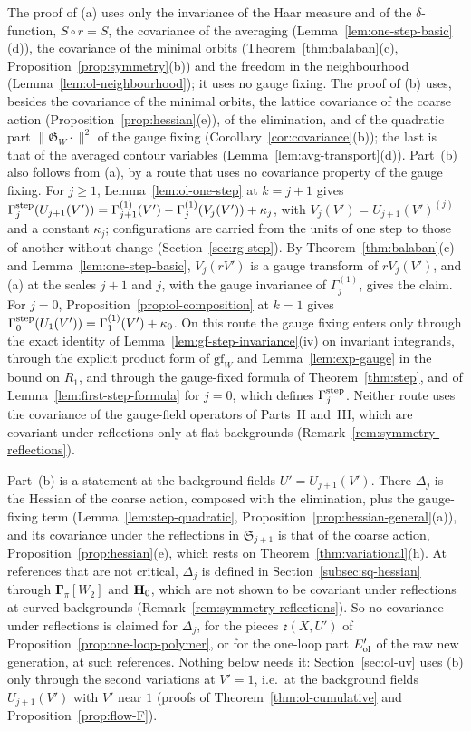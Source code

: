 The proof of (a) uses only the invariance of the Haar measure and of the $\delta$-function, $S\circ r=S$, the covariance of the averaging (Lemma~\ref{lem:one-step-basic}(d)), the covariance of the minimal orbits (Theorem~\ref{thm:balaban}(c), Proposition~\ref{prop:symmetry}(b)) and the freedom in the neighbourhood (Lemma~\ref{lem:ol-neighbourhood}); it uses no gauge fixing. The proof of (b) uses, besides the covariance of the minimal orbits, the lattice covariance of the coarse action (Proposition~\ref{prop:hessian}(e)), of the elimination, and of the quadratic part $\|\mathfrak G_W\cdot\|^2$ of the gauge fixing (Corollary~\ref{cor:covariance}(b)); the last is that of the averaged contour variables (Lemma~\ref{lem:avg-transport}(d)). Part~(b) also follows from (a), by a route that uses no covariance property of the gauge fixing. For $j\ge1$, Lemma~\ref{lem:ol-one-step} at $k=j+1$ gives $\Gamma^{\rm step}_j(U_{j+1}(V'))=\Gamma^{(1)}_{j+1}(V')-\Gamma^{(1)}_j(V_j(V'))+\kappa_j$, with $V_j(V')=U_{j+1}(V')^{(j)}$ and a constant $\kappa_j$; configurations are carried from the units of one step to those of another without change (Section~\ref{sec:rg-step}). By Theorem~\ref{thm:balaban}(c) and Lemma~\ref{lem:one-step-basic}, $V_j(rV')$ is a gauge transform of $rV_j(V')$, and (a) at the scales $j+1$ and $j$, with the gauge invariance of $\Gamma^{(1)}_j$, gives the claim. For $j=0$, Proposition~\ref{prop:ol-composition} at $k=1$ gives $\Gamma^{\rm step}_0(U_1(V'))=\Gamma^{(1)}_1(V')+\kappa_0$. On this route the gauge fixing enters only through the exact identity of Lemma~\ref{lem:gf-step-invariance}(iv) on invariant integrands, through the explicit product form of $\mathrm{gf}_W$ and Lemma~\ref{lem:exp-gauge} in the bound on $R_1$, and through the gauge-fixed formula of Theorem~\ref{thm:step}, and of Lemma~\ref{lem:first-step-formula} for $j=0$, which defines $\Gamma^{\rm step}_j$. Neither route uses the covariance of the gauge-field operators of Parts~II and~III, which are covariant under reflections only at flat backgrounds (Remark~\ref{rem:symmetry-reflections}).

Part~(b) is a statement at the background fields $U'=U_{j+1}(V')$. There $\Delta_j$ is the Hessian of the coarse action, composed with the elimination, plus the gauge-fixing term (Lemma~\ref{lem:step-quadratic}, Proposition~\ref{prop:hessian-general}(a)), and its covariance under the reflections in $\mathfrak S_{j+1}$ is that of the coarse action, Proposition~\ref{prop:hessian}(e), which rests on Theorem~\ref{thm:variational}(h). At references that are not critical, $\Delta_j$ is defined in Section~\ref{subsec:sq-hessian} through $\boldsymbol\Gamma_\pi[W_2]$ and $\mathbf H_0$, which are not shown to be covariant under reflections at curved backgrounds (Remark~\ref{rem:symmetry-reflections}). So no covariance under reflections is claimed for $\Delta_j$, for the pieces $\mathfrak e(X,U')$ of Proposition~\ref{prop:one-loop-polymer}, or for the one-loop part $E'_{\rm ol}$ of the raw new generation, at such references. Nothing below needs it: Section~\ref{sec:ol-uv} uses (b) only through the second variations at $V'=1$, i.e.\ at the background fields $U_{j+1}(V')$ with $V'$ near $1$ (proofs of Theorem~\ref{thm:ol-cumulative} and Proposition~\ref{prop:flow-F}).

